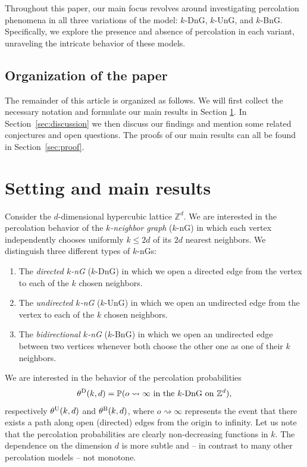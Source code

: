\documentclass[a4paper, oneside, 11pt]{amsart}
\theoremstyle{definition}
\newcommand{\1}{\mathbbm{1}}
\newcommand{\0}{\mathbf{o}}
\numberwithin{equation}{section}
\begin{document}
Throughout this paper, our main focus revolves around investigating percolation phenomena in all three variations of the model: $k$-DnG, $k$-UnG, and $k$-BnG. Specifically, we explore the presence and absence of percolation in each variant, unraveling the intricate behavior of these models.

\subsection{Organization of the paper}
The remainder of this article is organized as follows.
We will first collect the necessary notation and formulate our main results in Section \ref{sec:set}.
In Section~\ref{sec:discussion} we then discuss our findings and mention some related conjectures and open questions.
The proofs of our main results can all be found in Section~\ref{sec:proof}. 

\section{Setting and main results}\label{sec:set}

Consider the $d$-dimensional hypercubic lattice $\mathbb Z^d$. We are interested in the percolation behavior of the {\em $k$-neighbor graph} ($k$-nG) in which each vertex independently chooses uniformly $k\le 2d$ of its $2d$ nearest neighbors. We distinguish three different types of $k$-nGs:
\begin{enumerate}
\item The {\em directed $k$-nG} ($k$-DnG) in which we open a directed edge from the vertex to each of the $k$ chosen neighbors. 
\item The {\em undirected $k$-nG} ($k$-UnG) in which we open an undirected edge from the vertex to each of the $k$ chosen neighbors.
\item The {\em bidirectional $k$-nG} ($k$-BnG) in which we open an undirected edge between two vertices whenever both choose the other one as one of their $k$ neighbors.
\end{enumerate}
We are interested in the behavior of the percolation probabilities 
\begin{equation}\label{thetaD}
\theta^{\rm D}(k,d)=\mathbb P(o\rightsquigarrow\infty \text{ in the $k$-DnG on $\mathbb Z^d$}),
\end{equation}
respectively $\theta^{\rm U}(k,d)$ and $\theta^{\rm B}(k,d)$, %
where $o\rightsquigarrow\infty$ represents the event that there exists a path along open (directed) edges from the origin to infinity. Let us note that the percolation probabilities are clearly non-decreasing functions in $k$. The dependence on the dimension $d$ is more subtle and – in contrast to many other percolation models – not monotone. 
\end{document}
